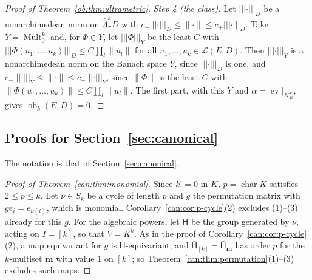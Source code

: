 \documentclass[11pt]{amsart}
\theoremstyle{definition}
\theoremstyle{remark}
\numberwithin{equation}{section}
\newcommand{\cL}{\mathcal L}
\newcommand{\Mult}{\operatorname{Mult}}
\newcommand{\norm}[1]{\lVert #1\rVert}
\theoremstyle{plain}
\theoremstyle{definition}
\theoremstyle{plain}
\newcommand{\ev}{\operatorname{ev}}
\newcommand{\ob}{\operatorname{ob}}
\newcommand{\hLambda}{\widehat\Lambda}
\newcommand{\cN}{\mathcal N}
\begin{document}
\begin{proof}[Proof of Theorem~\ref{ob:thm:ultrametric}]
\emph{Step 4 (the class).} Let $\lvert\!\lvert\!\lvert\cdot\rvert\!\rvert\!\rvert_D$ be a nonarchimedean norm on $\hLambda^k_\pi D$ with
$c_-\lvert\!\lvert\!\lvert\cdot\rvert\!\rvert\!\rvert_D\le\norm\cdot\le c_+\lvert\!\lvert\!\lvert\cdot\rvert\!\rvert\!\rvert_D$. Take $Y=\Mult^k_0$ and, for $\Phi\in Y$, let
$\lvert\!\lvert\!\lvert\Phi\rvert\!\rvert\!\rvert_Y$ be the least $C$ with $\lvert\!\lvert\!\lvert\Phi(u_1,\dots,u_k)\rvert\!\rvert\!\rvert_D\le C\prod_l\norm{u_l}$ for all $u_1,\dots,u_k\in\cL(E,D)$.
Then $\lvert\!\lvert\!\lvert\cdot\rvert\!\rvert\!\rvert_Y$ is a nonarchimedean norm on the Banach space $Y$, since $\lvert\!\lvert\!\lvert\cdot\rvert\!\rvert\!\rvert_D$ is one, and $c_-\lvert\!\lvert\!\lvert\cdot\rvert\!\rvert\!\rvert_Y\le\norm\cdot\le c_+\lvert\!\lvert\!\lvert\cdot\rvert\!\rvert\!\rvert_Y$,
since $\norm\Phi$ is the least $C$ with $\norm{\Phi(u_1,\dots,u_k)}\le C\prod_l\norm{u_l}$. The first part, with this $Y$ and
$\alpha=\ev|_{\cN^k_E}$, gives $\ob_k(E,D)=0$.
\end{proof}
\subsection{Proofs for Section~\ref{sec:canonical}}\label{dfr:ssec:canonical}

The notation is that of Section~\ref{sec:canonical}.

\begin{proof}[Proof of Theorem~\ref{can:thm:monomial}]
Since $k!=0$ in $K$, $p=\operatorname{char}K$ satisfies $2\le p\le k$. Let $\nu\in S_k$ be a cycle of length $p$ and $g$
the permutation matrix with $ge_i=e_{\nu(i)}$, which is monomial. Corollary~\ref{can:cor:p-cycle}(2) excludes (1)--(3)
already for this $g$. For the algebraic powers, let $\mathsf H$ be the group generated by $\nu$, acting on $I=[k]$, so
that $V=K^k$. As in the proof of Corollary~\ref{can:cor:p-cycle}(2), a map equivariant for $g$ is
$\mathsf H$\nobreakdash-equivariant, and $\bar{\mathsf H}_{[k]}=\bar{\mathsf H}_{\mathbf m}$ has order $p$ for the
$k$\nobreakdash-multiset $\mathbf m$ with value $1$ on $[k]$; so Theorem~\ref{can:thm:permutation}(1)--(3) excludes such
maps.
\end{proof}
\end{document}
